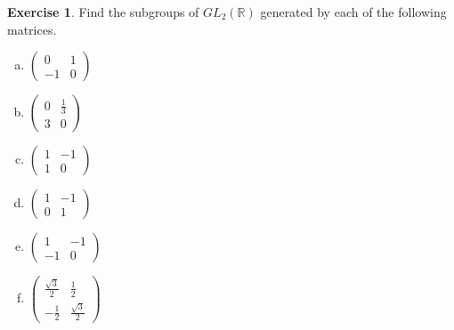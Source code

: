 \documentclass{article}
\theoremstyle{definition}
\newtheorem{theorem}{Exercise}[section]
\newcommand{\R}{\mathbb{R}}
\begin{document}
	\setcounter{theorem}{3}
	\begin{theorem}
		Find the subgroups of $GL_2\left(\R\right)$ generated by each of the following matrices.
		\begin{multicols}{3}
		\begin{enumerate}[(a)]
			\item $\begin{pmatrix}
				0 & 1 \\ 
				-1 & 0
			\end{pmatrix}$			
			\item $\begin{pmatrix}
			0 & \frac{1}{3} \\ 
			3 & 0
			\end{pmatrix} $ 
			\item $\begin{pmatrix}
				1 & -1 \\ 
				1 & 0
			\end{pmatrix}$
			\item $\begin{pmatrix}
			1 & -1 \\ 
			0 & 1
			\end{pmatrix} $
			\item $\begin{pmatrix}
			1 & -1 \\ 
			-1 & 0
			\end{pmatrix} $ 
			\item $\begin{pmatrix}
			\frac{\sqrt{3}}{2} & \frac{1}{2} \\ 
			-\frac{1}{2} & \frac{\sqrt{3}}{2}
			\end{pmatrix} $
		\end{enumerate}
		\end{multicols}
	\end{theorem}
\end{document}
